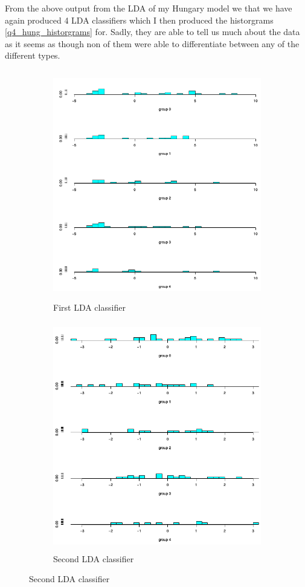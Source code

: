 \documentclass[a4paper]{article}
\begin{document}


From the above output from the LDA of my Hungary model we that we have again
produced 4 LDA classifiers which I then produced the historgrams
\ref{q4_hung_historgrams} for. Sadly, they are able to tell us much about the
data as it seems as though non of them were able to differentiate between any of
the different types.

\begin{figure}[H]
	\begin{subfigure}{0.5\textwidth}
		\caption{First LDA classifier}
		\includegraphics[width=0.9\linewidth, height=10cm]{Q4_pics/Hung-Hist1.png}
	\end{subfigure}
	\begin{subfigure}{0.5\textwidth}
		\caption{Second LDA classifier}
		\includegraphics[width=0.9\linewidth, height=10cm]{Q4_pics/Hung-Hist2.png}
	\end{subfigure}


\end{figure}
\end{document}
